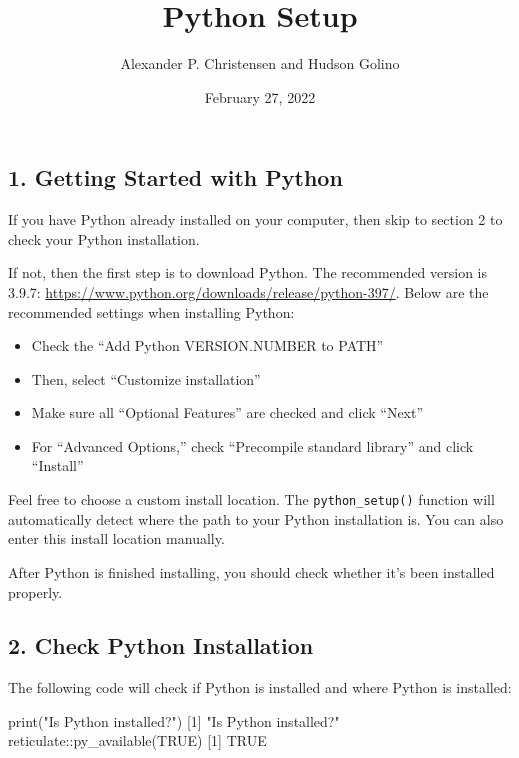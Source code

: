 \documentclass[
]{article}
\title{Python Setup}
\author{Alexander P. Christensen and Hudson Golino}
\date{February 27, 2022}
\newenvironment{Shaded}{\begin{snugshade}}{\end{snugshade}}
\newcommand{\ConstantTok}[1]{\textcolor[rgb]{0.00,0.00,0.00}{#1}}
\newcommand{\DecValTok}[1]{\textcolor[rgb]{0.00,0.00,0.81}{#1}}
\newcommand{\FunctionTok}[1]{\textcolor[rgb]{0.00,0.00,0.00}{#1}}
\newcommand{\NormalTok}[1]{#1}
\newcommand{\SpecialCharTok}[1]{\textcolor[rgb]{0.00,0.00,0.00}{#1}}
\newcommand{\StringTok}[1]{\textcolor[rgb]{0.31,0.60,0.02}{#1}}
\begin{document}
\maketitle

\hypertarget{getting-started-with-python}{%
\subsection{1. Getting Started with
Python}\label{getting-started-with-python}}

If you have Python already installed on your computer, then skip to
section 2 to check your Python installation.

If not, then the first step is to download Python. The recommended
version is 3.9.7:
\url{https://www.python.org/downloads/release/python-397/}. Below are
the recommended settings when installing Python:

\begin{itemize}
\item
  Check the ``Add Python VERSION.NUMBER to PATH''
\item
  Then, select ``Customize installation''
\item
  Make sure all ``Optional Features'' are checked and click ``Next''
\item
  For ``Advanced Options,'' check ``Precompile standard library'' and
  click ``Install''
\end{itemize}

Feel free to choose a custom install location. The
\texttt{python\_setup()} function will automatically detect where the
path to your Python installation is. You can also enter this install
location manually.

After Python is finished installing, you should check whether it's been
installed properly.

\hypertarget{check-python-installation}{%
\subsection{2. Check Python
Installation}\label{check-python-installation}}

The following code will check if Python is installed and where Python is
installed:

\begin{Shaded}
\begin{Highlighting}[]
\FunctionTok{print}\NormalTok{(}\StringTok{"Is Python installed?"}\NormalTok{)}
\NormalTok{[}\DecValTok{1}\NormalTok{] }\StringTok{"Is Python installed?"}
\NormalTok{reticulate}\SpecialCharTok{::}\FunctionTok{py\_available}\NormalTok{(}\ConstantTok{TRUE}\NormalTok{)}
\NormalTok{[}\DecValTok{1}\NormalTok{] }\ConstantTok{TRUE}
\end{Highlighting}
\end{Shaded}
\end{document}

